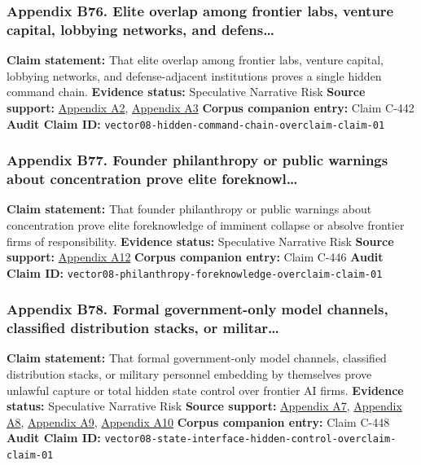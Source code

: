 \documentclass[
  american,
  11pt,
  letterpaper,
]{article}
\begin{document}
\subsubsection{Appendix B76. Elite overlap among frontier labs, venture
capital, lobbying networks, and
defens\ldots{}}\label{ch-08-appendix-b76-elite-overlap-among-frontier-labs-venture-capital-lobbying-networks-and-defens}

\textbf{Claim statement:} That elite overlap among frontier labs,
venture capital, lobbying networks, and defense-adjacent institutions
proves a single hidden command chain. \textbf{Evidence status:}
Speculative Narrative Risk \textbf{Source support:}
\hyperref[ch-08-appendix-a2-openai-appoints-former-top-us-cyberwarrior-paul-nakasone-to-its-board-of-directors]{Appendix
A2},
\hyperref[ch-08-appendix-a3-anthropic-outspends-openai-in-biggest-ever-lobbying-quarter]{Appendix
A3} \textbf{Corpus companion entry:} Claim C-442 \textbf{Audit Claim
ID:} \texttt{vector08-hidden-command-chain-overclaim-claim-01}

\subsubsection{Appendix B77. Founder philanthropy or public warnings
about concentration prove elite
foreknowl\ldots{}}\label{ch-08-appendix-b77-founder-philanthropy-or-public-warnings-about-concentration-prove-elite-foreknowl}

\textbf{Claim statement:} That founder philanthropy or public warnings
about concentration prove elite foreknowledge of imminent collapse or
absolve frontier firms of responsibility. \textbf{Evidence status:}
Speculative Narrative Risk \textbf{Source support:}
\hyperref[ch-08-appendix-a12-the-adolescence-of-technology]{Appendix
A12} \textbf{Corpus companion entry:} Claim C-446 \textbf{Audit Claim
ID:} \texttt{vector08-philanthropy-foreknowledge-overclaim-claim-01}

\subsubsection{Appendix B78. Formal government-only model channels,
classified distribution stacks, or
militar\ldots{}}\label{ch-08-appendix-b78-formal-government-only-model-channels-classified-distribution-stacks-or-militar}

\textbf{Claim statement:} That formal government-only model channels,
classified distribution stacks, or military personnel embedding by
themselves prove unlawful capture or total hidden state control over
frontier AI firms. \textbf{Evidence status:} Speculative Narrative Risk
\textbf{Source support:}
\hyperref[ch-08-appendix-a7-introducing-openai-for-government]{Appendix
A7},
\hyperref[ch-08-appendix-a8-claude-gov-models-for-u-s-national-security-customers]{Appendix
A8},
\hyperref[ch-08-appendix-a9-anthropic-and-palantir-partner-to-bring-claude-ai-models-to-aws-for-u-s-government-intelligence-and-defense-operations]{Appendix
A9},
\hyperref[ch-08-appendix-a10-army-launches-detachment-201-executive-innovation-corps-to-drive-tech-transformation]{Appendix
A10} \textbf{Corpus companion entry:} Claim C-448 \textbf{Audit Claim
ID:} \texttt{vector08-state-interface-hidden-control-overclaim-claim-01}
\end{document}
